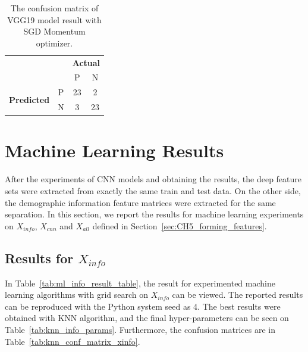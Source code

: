 \begin{table}[!h]
\centering
\caption{The confusion matrix of VGG19 model result with SGD Momentum optimizer.}
\label{tab:conf_vgg19}
\begin{tabular}{|cc|c|c|}
\cline{1-4}
                                                 &   & \multicolumn{2}{c|}{\textbf{Actual}} \\ \cline{3-4} 
                                                 &   & P            & N            \\ \hline
\multicolumn{1}{|c|}{\multirow{2}{*}{\textbf{Predicted}}} & P & 23           & 2            \\ \cline{2-4} 
\multicolumn{1}{|c|}{}                           & N & 3            & 23           \\ \hline
\end{tabular}
\end{table}

\section{Machine Learning Results}



After the experiments of CNN models and obtaining the results, the deep feature sets were extracted from exactly the same train and test data. On the other side, the demographic information feature matrices were extracted for the same separation. In this section, we report the results for machine learning experiments on $X_{info}$, $X_{cnn}$ and $X_{all}$ defined in Section~\ref{sec:CH5_forming_features}.


 
\subsection{Results for $X_{info}$} \label{CH6:results_xinfo}

In Table~\ref{tab:ml_info_result_table}, the result for experimented machine learning algorithms with grid search on $X_{info}$ can be viewed. The reported results can be reproduced with the Python system seed as 4. The best results were obtained with KNN algorithm, and the final hyper-parameters can be seen on Table~\ref{tab:knn_info_params}. Furthermore, the confusion matrices are in Table~\ref{tab:knn_conf_matrix_xinfo}.

